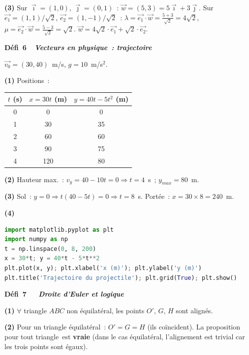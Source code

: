 \textbf{(3)} Sur $\vec{\imath}=(1,0)$, $\vec{\jmath}=(0,1)$~:
$\vec{w}=(5,3)=5\vec{\imath}+3\vec{\jmath}$.
Sur $\vec{e_1}=(1,1)/\sqrt{2}$, $\vec{e_2}=(1,-1)/\sqrt{2}$~:
$\lambda=\vec{e_1}\cdot\vec{w}=\frac{5+3}{\sqrt{2}}=4\sqrt{2}$,
$\mu=\vec{e_2}\cdot\vec{w}=\frac{5-3}{\sqrt{2}}=\sqrt{2}$.
$\vec{w}=4\sqrt{2}\cdot\vec{e_1}+\sqrt{2}\cdot\vec{e_2}$.\checkmark

\noindent{}
{\color{BO}\bfseries\small D\'efi~6~\textendash\ \textit{Vecteurs en physique~: trajectoire}}
\par\smallskip

$\vec{v_0}=(30,40)$~m/s, $g=10$~m/s$^2$.

\textbf{(1)} Positions~:
\begin{center}
\begin{tabular}{c|cc}
$t$ (s) & $x=30t$ (m) & $y=40t-5t^2$ (m) \\\hline
0 & 0 & 0 \\ 1 & 30 & 35 \\ 2 & 60 & 60 \\ 3 & 90 & 75 \\ 4 & 120 & 80
\end{tabular}
\end{center}

\textbf{(2)} Hauteur max.~: $v_y=40-10t=0\Rightarrow t=4$~s~; $y_{max}=80$~m.

\textbf{(3)} Sol~: $y=0\Rightarrow t(40-5t)=0\Rightarrow t=8$~s.
Port\'ee~: $x=30\times8=240$~m.

\textbf{(4)}
\begin{lstlisting}[language=Python]
import matplotlib.pyplot as plt
import numpy as np
t = np.linspace(0, 8, 200)
x = 30*t; y = 40*t - 5*t**2
plt.plot(x, y); plt.xlabel('x (m)'); plt.ylabel('y (m)')
plt.title('Trajectoire du projectile'); plt.grid(True); plt.show()
\end{lstlisting}

\noindent{}
{\color{BO}\bfseries\small D\'efi~7~\textendash\ \textit{\logiq\ Droite d'Euler et logique}}
\par\smallskip

\textbf{(1)} $\forall$ triangle $ABC$ non \'equilat\'eral, les points $O'$, $G$, $H$ sont align\'es.

\textbf{(2)} Pour un triangle \'equilat\'eral~: $O'=G=H$ (ils co\"incident).
La proposition \og pour tout triangle\fg\ est \textbf{vraie} (dans le cas \'equilat\'eral, l'alignement est trivial car les trois points sont \'egaux).

